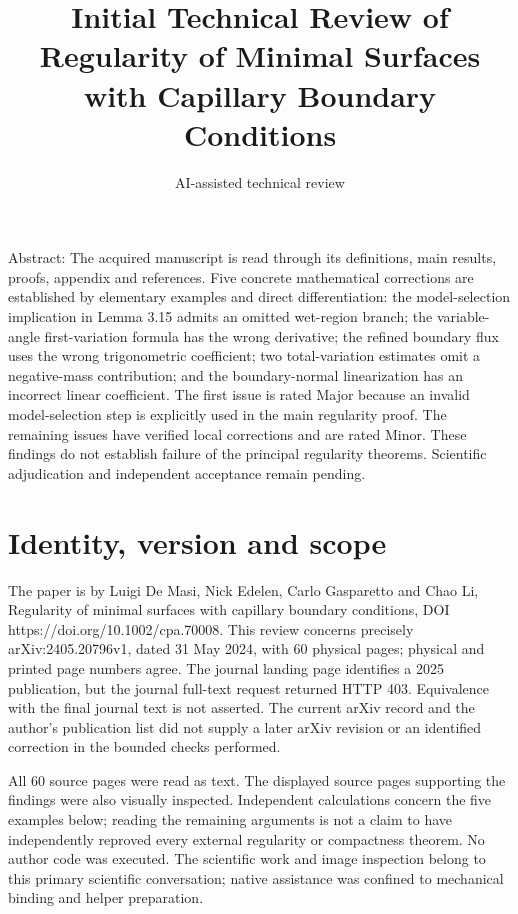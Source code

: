 \documentclass[10pt]{article}
\title{Initial Technical Review of
Regularity of Minimal Surfaces
with Capillary Boundary Conditions}
\author{AI-assisted technical review}
\date{}
\begin{document}
\maketitle
Abstract: The acquired manuscript is read through its definitions, main results, proofs, appendix and references. Five concrete mathematical corrections are established by elementary examples and direct differentiation: the model-selection implication in Lemma 3.15 admits an omitted wet-region branch; the variable-angle first-variation formula has the wrong derivative; the refined boundary flux uses the wrong trigonometric coefficient; two total-variation estimates omit a negative-mass contribution; and the boundary-normal linearization has an incorrect linear coefficient. The first issue is rated Major because an invalid model-selection step is explicitly used in the main regularity proof. The remaining issues have verified local corrections and are rated Minor. These findings do not establish failure of the principal regularity theorems. Scientific adjudication and independent acceptance remain pending.\par
\section*{Identity, version and scope}
The paper is by Luigi De Masi, Nick Edelen, Carlo Gasparetto and Chao Li, Regularity of minimal surfaces with capillary boundary conditions, DOI https://doi.org/10.1002/cpa.70008. This review concerns precisely arXiv:2405.20796v1, dated 31 May 2024, with 60 physical pages; physical and printed page numbers agree. The journal landing page identifies a 2025 publication, but the journal full-text request returned HTTP 403. Equivalence with the final journal text is not asserted. The current arXiv record and the author’s publication list did not supply a later arXiv revision or an identified correction in the bounded checks performed.\par
All 60 source pages were read as text. The displayed source pages supporting the findings were also visually inspected. Independent calculations concern the five examples below; reading the remaining arguments is not a claim to have independently reproved every external regularity or compactness theorem. No author code was executed. The scientific work and image inspection belong to this primary scientific conversation; native assistance was confined to mechanical binding and helper preparation.\par
\end{document}
